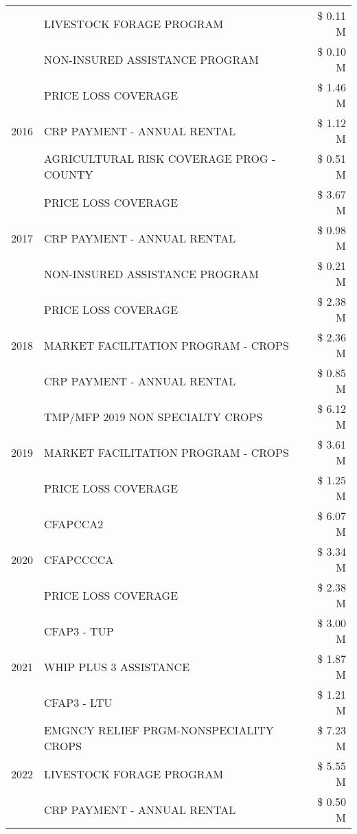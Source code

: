 \begin{tabular}{llr}
 & LIVESTOCK FORAGE PROGRAM & \$ 0.11 M \\
 & NON-INSURED ASSISTANCE PROGRAM & \$ 0.10 M \\
\cline{1-3}
\multirow[t]{3}{*}{2016} & PRICE LOSS COVERAGE & \$ 1.46 M \\
 & CRP PAYMENT - ANNUAL RENTAL & \$ 1.12 M \\
 & AGRICULTURAL RISK COVERAGE PROG - COUNTY & \$ 0.51 M \\
\cline{1-3}
\multirow[t]{3}{*}{2017} & PRICE LOSS COVERAGE & \$ 3.67 M \\
 & CRP PAYMENT - ANNUAL RENTAL & \$ 0.98 M \\
 & NON-INSURED ASSISTANCE PROGRAM & \$ 0.21 M \\
\cline{1-3}
\multirow[t]{3}{*}{2018} & PRICE LOSS COVERAGE & \$ 2.38 M \\
 & MARKET FACILITATION PROGRAM - CROPS & \$ 2.36 M \\
 & CRP PAYMENT - ANNUAL RENTAL & \$ 0.85 M \\
\cline{1-3}
\multirow[t]{3}{*}{2019} & TMP/MFP 2019 NON SPECIALTY CROPS & \$ 6.12 M \\
 & MARKET FACILITATION PROGRAM - CROPS & \$ 3.61 M \\
 & PRICE LOSS COVERAGE & \$ 1.25 M \\
\cline{1-3}
\multirow[t]{3}{*}{2020} & CFAPCCA2 & \$ 6.07 M \\
 & CFAPCCCCA & \$ 3.34 M \\
 & PRICE LOSS COVERAGE & \$ 2.38 M \\
\cline{1-3}
\multirow[t]{3}{*}{2021} & CFAP3 - TUP & \$ 3.00 M \\
 & WHIP PLUS 3 ASSISTANCE & \$ 1.87 M \\
 & CFAP3 - LTU & \$ 1.21 M \\
\cline{1-3}
\multirow[t]{3}{*}{2022} & EMGNCY RELIEF PRGM-NONSPECIALITY CROPS & \$ 7.23 M \\
 & LIVESTOCK FORAGE PROGRAM & \$ 5.55 M \\
 & CRP PAYMENT - ANNUAL RENTAL & \$ 0.50 M \\
\cline{1-3}
\bottomrule
\end{tabular}
